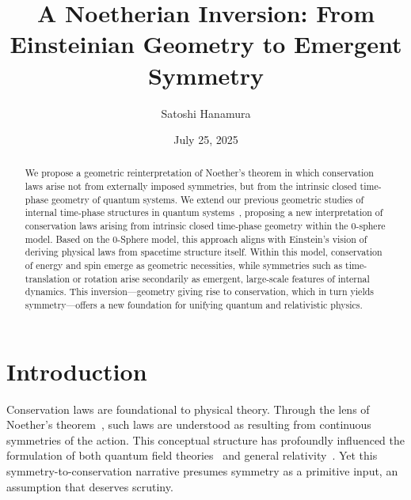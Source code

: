 \documentclass[%
 reprint,
 amsmath,amssymb,
 aps,
]{revtex4-1}
\numberwithin{equation}{section}%
\begin{document}


\title{A Noetherian Inversion: From Einsteinian Geometry to Emergent Symmetry}
\author{Satoshi Hanamura}
\date{July 25, 2025}


\begin{abstract}
We propose a geometric reinterpretation of Noether’s theorem in which conservation laws arise not from externally imposed symmetries, but from the intrinsic closed time-phase geometry of quantum systems. We extend our previous geometric studies of internal time-phase structures in quantum systems~\cite{hanamura2506.0119, hanamura2507.0128}, proposing a new interpretation of conservation laws arising from intrinsic closed time-phase geometry within the 0-sphere model. Based on the 0-Sphere model, this approach aligns with Einstein’s vision of deriving physical laws from spacetime structure itself. Within this model, conservation of energy and spin emerge as geometric necessities, while symmetries such as time-translation or rotation arise secondarily as emergent, large-scale features of internal dynamics. This inversion—geometry giving rise to conservation, which in turn yields symmetry—offers a new foundation for unifying quantum and relativistic physics.
\end{abstract}

\maketitle

\section{Introduction}
Conservation laws are foundational to physical theory. Through the lens of Noether's theorem~\cite{noether1918}, such laws are understood as resulting from continuous symmetries of the action. This conceptual structure has profoundly influenced the formulation of both quantum field theories~\cite{weinberg1995} and general relativity~\cite{einstein1915}. Yet this symmetry-to-conservation narrative presumes symmetry as a primitive input, an assumption that deserves scrutiny.
\end{document}
